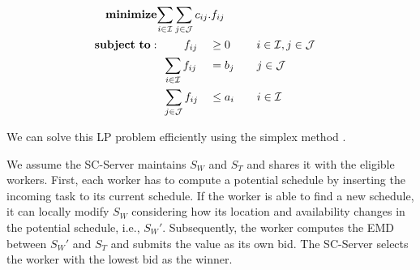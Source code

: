 
\setcounter{equation}{0}
\begin{alignat}{2}
\mathbf{minimize}&\mathrlap{\sum_{i \in \mathcal{I}} \sum_{j \in \mathcal{J}} c_{ij}.f_{ij}} \notag\\
\mathbf{subject\ to:}&\phantom{{a}={a}} f_{ij} && \geq 0 \ \quad\quad i \in \mathcal{I}, j \in \mathcal{J}\\
&\phantom{{a}}\sum_{i \in \mathcal{I}} f_{ij} &&= b_j \quad\quad j \in \mathcal{J}\\
&\phantom{{a}}\sum_{j \in \mathcal{J}} f_{ij} &&\leq a_i \quad\quad i \in \mathcal{I}
\end{alignat}



\noindent We can solve this LP problem efficiently using the simplex method \cite{Dantzig90}.

We assume the SC-Server maintains $S_W$ and $S_T$ and shares it with the eligible workers. First, each worker has to compute a potential schedule by inserting the incoming task to its current schedule. If the worker is able to find a new schedule, it can locally modify $S_W$ considering how its location and availability changes in the potential schedule, i.e., $S_{W}'$. Subsequently, the worker computes the EMD between $S_{W}'$ and $S_T$ and submits the value as its own bid. The SC-Server selects the worker with the lowest bid as the winner.

